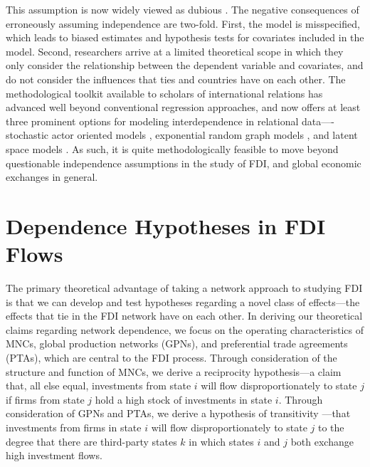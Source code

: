 \documentclass[reqno,onecolumn,letterpaper,12pt]{article}
\begin{document}
This assumption is now widely viewed as dubious \citep[see, e.g., ][]{ward2007persistent, chu2010homogenization,cranmer2016critique,dorff2013networks,lee2013network,howell2013geography,kinne2016agreeing,Franzese_et_al:2012,Hays_et_al:2010}. The negative consequences of erroneously assuming independence are two-fold. First, the model is misspecified, which leads to biased estimates and hypothesis tests for covariates included in the model. Second, researchers arrive at a limited theoretical scope in which they only consider the relationship between the dependent variable and covariates, and do not consider the influences that ties and countries have on each other. The methodological toolkit available to scholars of international relations has advanced well beyond conventional regression approaches, and now offers at least three prominent options for modeling interdependence in relational data----stochastic actor oriented models \citep[e.g., ][]{camber2010geometry,kinne2016agreeing,kinne2013network,kinne2014dependent,warren2016modeling}, exponential random graph models \citep[e.g.,][]{cranmer2012complex,cranmer2012toward,raeymaeckers2016influence}, and latent space models \citep[e.g., ][]{ward2007disputes,ward2013gravity,metternich2013antigovernment}. As such, it is quite methodologically feasible to move beyond questionable independence assumptions in the study of FDI, and global economic exchanges in general.


\section{Dependence Hypotheses in FDI Flows}

The primary theoretical advantage of taking a network approach to studying FDI is that we can develop and test hypotheses regarding a novel class of effects---the effects that tie in the FDI network have on each other. In deriving our theoretical claims regarding network dependence, we focus on the operating characteristics of MNCs, global production networks (GPNs), and preferential trade agreements (PTAs), which are central to the FDI process. Through consideration of the structure and function of MNCs, we derive a reciprocity \citep{garlaschelli2004patterns} hypothesis---a claim that, all else equal, investments from state $i$ will flow disproportionately to state $j$ if firms from state $j$ hold a high stock of investments in state $i$. Through consideration of GPNs and PTAs, we derive a hypothesis of transitivity \citep{holland1971transitivity}---that investments from firms in state $i$ will flow disproportionately to state $j$ to the degree that there are third-party states $k$ in which states $i$ and $j$ both exchange high investment flows.
\end{document}
